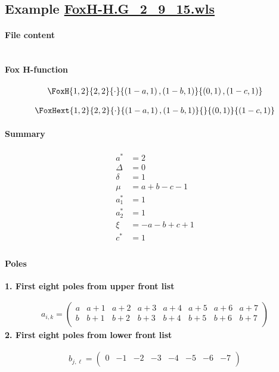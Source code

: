 \documentclass[preview]{standalone}
\begin{document}
\subsection{Example \url{FoxH-H.G_2_9_15.wls}}

\paragraph{File content}

\inputminted{text}{../Examples/FoxH-H.G_2_9_15.wls}

\paragraph{Fox H-function}

\begin{align*}
  \FoxH
    {1,2}
    {2,2}
    {\cdot}
    {\left(1-a, 1\right), \left(1-b, 1\right)}
    {\left(0, 1\right), \left(1-c, 1\right)}
\end{align*}

\begin{align*}
  \FoxHext
    {1,2}
    {2,2}
    {\cdot}
    {\left(1-a, 1\right), \left(1-b, 1\right)}
    {}
    {\left(0, 1\right)}
    {\left(1-c, 1\right)}
\end{align*}

\paragraph{Summary}

\begin{align*}
  a^*    & = 2 \\
  \Delta & = 0 \\
  \delta & = 1 \\
  \mu    & = a+b-c-1 \\
  a_1^*  & = 1 \\
  a_2^*  & = 1 \\
  \xi    & = -a-b+c+1 \\
  c^*    & = 1 \\
\end{align*}

\paragraph{Poles}

\noindent\textbf{1. First eight poles from upper front list}

\begin{align*}
  a_{i,k} = 
  \left(
\begin{array}{cccccccc}
 a & a+1 & a+2 & a+3 & a+4 & a+5 & a+6 & a+7 \\
 b & b+1 & b+2 & b+3 & b+4 & b+5 & b+6 & b+7 \\
\end{array}
\right)
\end{align*}
\noindent\textbf{2. First eight poles from lower front list}

\begin{align*}
  b_{j,\ell} = 
  \left(
\begin{array}{cccccccc}
 0 & -1 & -2 & -3 & -4 & -5 & -6 & -7 \\
\end{array}
\right)
\end{align*}
\end{document}
